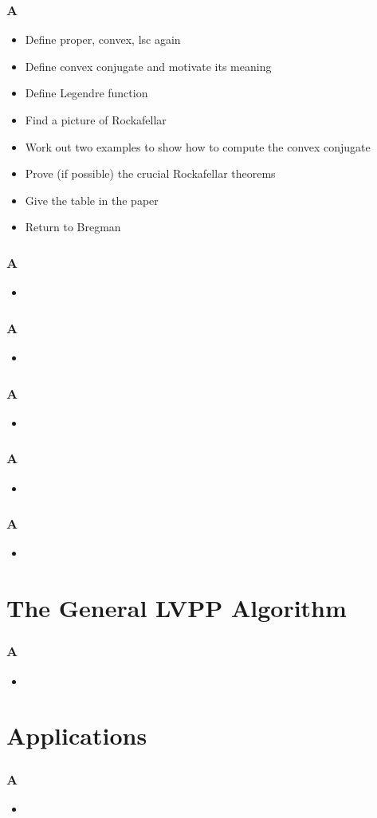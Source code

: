 \documentclass[aspectratio=169,xcolor=dvipsnames,11pt]{beamer}
\begin{document}
\begin{frame}\frametitle{A}
\begin{itemize}
\item Define proper, convex, lsc again
\item Define convex conjugate and motivate its meaning
\item Define Legendre function
\item Find a picture of Rockafellar
\item Work out two examples to show how to compute the convex conjugate
\item Prove (if possible) the crucial Rockafellar theorems
\item Give the table in the paper
\item Return to Bregman 
\end{itemize}
\end{frame}

\begin{frame}\frametitle{A}
\begin{itemize}
\item
\end{itemize}
\end{frame}

\begin{frame}\frametitle{A}
\begin{itemize}
\item
\end{itemize}
\end{frame}

\begin{frame}\frametitle{A}
\begin{itemize}
\item
\end{itemize}
\end{frame}

\begin{frame}\frametitle{A}
\begin{itemize}
\item
\end{itemize}
\end{frame}

\begin{frame}\frametitle{A}
\begin{itemize}
\item
\end{itemize}
\end{frame}

\section{The General LVPP Algorithm}
\begin{frame}\frametitle{A}
\begin{itemize}
\item
\end{itemize}
\end{frame}

\section{Applications}
\begin{frame}\frametitle{A}
\begin{itemize}
\item
\end{itemize}
\end{frame}
\end{document}
